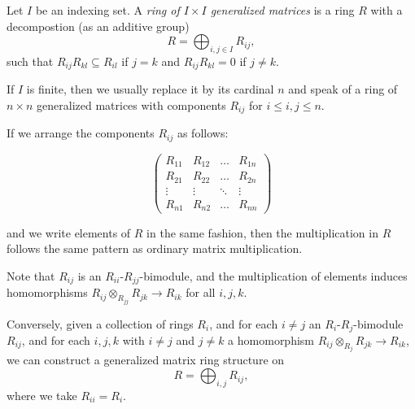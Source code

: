 \documentclass[12pt]{article}
\begin{document}
Let $I$ be an indexing set.  A {\em ring of $I \times I$ generalized matrices}
is a ring $R$ with a decompostion (as an additive group)
$$R = \bigoplus_{i,j \in I} R_{ij}, $$
such that $R_{ij} R_{kl} \subseteq R_{il}$ if $j = k$ and
$R_{ij} R_{kl} = 0$ if $j \neq k$.

If $I$ is finite, then we usually replace it by its cardinal $n$
and speak of a ring of $n \times n$ generalized matrices with components
$R_{ij}$ for $i \le i,j \le n$.

If we arrange the components $R_{ij}$ as follows:

\begin{displaymath}
  \begin{pmatrix}
    R_{11} & R_{12} & \dots & R_{1n} \\
    R_{21} & R_{22} & \dots & R_{2n} \\
    \vdots & \vdots & \ddots & \vdots \\
    R_{n1} & R_{n2} & \dots & R_{nn}
  \end{pmatrix}
\end{displaymath}

and we write elements of $R$ in the same fashion, then the multiplication in $R$ follows
the same pattern as ordinary matrix multiplication.

Note that $R_{ij}$ is an $R_{ii}$-$R_{jj}$-bimodule,
and the multiplication of elements induces homomorphisms
$R_{ij} \otimes_{R_{jj}} R_{jk} \to R_{ik}$ for all $i, j, k$.

Conversely, given a collection of rings $R_i$,
and for each $i \neq j$ an $R_i$-$R_j$-bimodule $R_{ij}$,
and for each $i, j,  k$ with $i \neq j$ and $j \neq k$
a homomorphism $R_{ij} \otimes_{R_{j}} R_{jk} \to R_{ik}$,
we can construct a generalized matrix ring structure on
$$R = \bigoplus_{i,j} R_{ij},$$
where we take $R_{ii} = R_i$.
\end{document}
